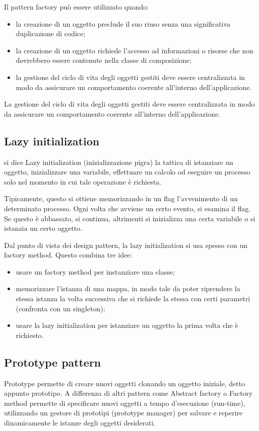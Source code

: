 Il pattern factory può essere utilizzato quando:
\begin{itemize}
	\item la creazione di un oggetto preclude il suo riuso senza una significativa duplicazione di codice;
	\item la creazione di un oggetto richiede l'accesso ad informazioni o risorse che non dovrebbero essere contenute nella classe di composizione;
	\item la gestione del ciclo di vita degli oggetti gestiti deve essere centralizzata in modo da assicurare un comportamento coerente all'interno dell'applicazione.
\end{itemize}
La gestione del ciclo di vita degli oggetti gestiti deve essere centralizzata in modo da assicurare un comportamento coerente all'interno dell'applicazione.
\subsection{Lazy initialization}
si dice Lazy initialization (inizializzazione pigra) la tattica di istanziare un oggetto, inizializzare una variabile, effettuare un calcolo od eseguire un processo solo nel momento in cui tale operazione è richiesta.

Tipicamente, questo si ottiene memorizzando in un flag l'avvenimento di un determinato processo. Ogni volta che avviene un certo evento, si esamina il flag. Se questo è abbassato, si continua, altrimenti si inizializza una certa variabile o si istanzia un certo oggetto.

Dal punto di vista dei design pattern, la lazy initialization si usa spesso con un factory method. Questo combina tre idee:
\begin{itemize}
	\item usare un factory method per instanziare una classe;
	\item memorizzare l'istanza di una mappa, in modo tale da poter riprendere la stessa istanza la volta successiva che si richiede la stessa con certi parametri (confronta con un singleton);
	\item usare la lazy initialization per istanziare un oggetto la prima volta che è richiesto.
\end{itemize}

\subsection{Prototype pattern}
Prototype permette di creare nuovi oggetti clonando un oggetto iniziale, detto appunto prototipo. A differenza di altri pattern come Abstract factory o Factory method permette di specificare nuovi oggetti a tempo d'esecuzione (run-time), utilizzando un gestore di prototipi (prototype manager) per salvare e reperire dinamicamente le istanze degli oggetti desiderati.

